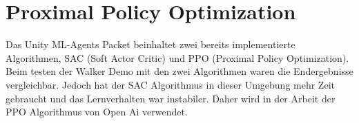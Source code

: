 {\section{Proximal Policy Optimization}}
\label{sec:ppo}
Das Unity ML-Agents Packet beinhaltet zwei bereits implementierte Algorithmen, SAC (Soft Actor Critic) und PPO (Proximal Policy Optimization). Beim testen der Walker Demo mit den zwei Algorithmen waren die Endergebnisse vergleichbar.
Jedoch hat der SAC Algorithmus in dieser Umgebung mehr Zeit gebraucht und das Lernverhalten war instabiler. Daher wird in der Arbeit der PPO Algorithmus von Open Ai verwendet.
